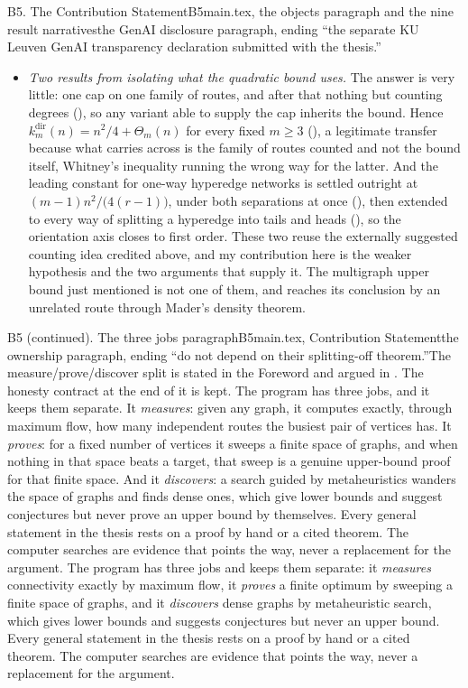 \begin{offcutrewrite}{B5. The Contribution Statement}{B5}{main.tex, the objects paragraph and the nine result narratives}{the GenAI disclosure paragraph, ending ``the separate KU Leuven GenAI transparency declaration submitted with the thesis.''}
\begin{itemize}
  \item \emph{Two results from isolating what the quadratic bound uses.} The answer is very little: one cap on one family of routes, and after that nothing but counting degrees (), so any variant able to supply the cap inherits the bound. Hence $k_m^{\mathrm{dir}}(n) = n^2/4 + \Theta_m(n)$ for every fixed $m \ge 3$ (), a legitimate transfer because what carries across is the family of routes counted and not the bound itself, Whitney's inequality running the wrong way for the latter. And the leading constant for one-way hyperedge networks is settled outright at $(m-1)n^2/\bigl(4(r-1)\bigr)$, under both separations at once (), then extended to every way of splitting a hyperedge into tails and heads (), so the orientation axis closes to first order. These two reuse the externally suggested counting idea credited above, and my contribution here is the weaker hypothesis and the two arguments that supply it. The multigraph upper bound just mentioned is not one of them, and reaches its conclusion by an unrelated route through Mader's density theorem.
\end{itemize}
\end{offcutrewrite}

\begin{offcutrewrite}{B5 (continued). The three jobs paragraph}{B5}{main.tex, Contribution Statement}{the ownership paragraph, ending ``do not depend on their splitting-off theorem.''}{The measure/prove/discover split is stated in the Foreword and argued in . The honesty contract at the end of it is kept.}
The program has three jobs, and it keeps them separate. It \emph{measures}: given any graph, it computes exactly, through maximum flow, how many independent routes the busiest pair of vertices has. It \emph{proves}: for a fixed number of vertices it sweeps a finite space of graphs, and when nothing in that space beats a target, that sweep is a genuine upper-bound proof for that finite space. And it \emph{discovers}: a search guided by metaheuristics wanders the space of graphs and finds dense ones, which give lower bounds and suggest conjectures but never prove an upper bound by themselves. Every general statement in the thesis rests on a proof by hand or a cited theorem. The computer searches are evidence that points the way, never a replacement for the argument.
\nowreads
The program has three jobs and keeps them separate: it \emph{measures} connectivity exactly by maximum flow, it \emph{proves} a finite optimum by sweeping a finite space of graphs, and it \emph{discovers} dense graphs by metaheuristic search, which gives lower bounds and suggests conjectures but never an upper bound. Every general statement in the thesis rests on a proof by hand or a cited theorem. The computer searches are evidence that points the way, never a replacement for the argument.
\end{offcutrewrite}

